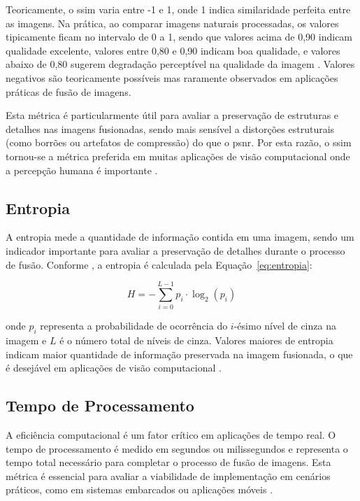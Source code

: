 Teoricamente, o \gls{ssim} varia entre -1 e 1, onde 1 indica similaridade perfeita entre as imagens. Na prática, ao comparar imagens naturais processadas, os valores tipicamente ficam no intervalo de 0 a 1, sendo que valores acima de 0,90 indicam qualidade excelente, valores entre 0,80 e 0,90 indicam boa qualidade, e valores abaixo de 0,80 sugerem degradação perceptível na qualidade da imagem \cite{wang2004image}. Valores negativos são teoricamente possíveis mas raramente observados em aplicações práticas de fusão de imagens.

Esta métrica é particularmente útil para avaliar a preservação de estruturas e detalhes nas imagens fusionadas, sendo mais sensível a distorções estruturais (como borrões ou artefatos de compressão) do que o \gls{psnr}. Por esta razão, o \gls{ssim} tornou-se a métrica preferida em muitas aplicações de visão computacional onde a percepção humana é importante \cite{wang2004image}.

\subsection*{Entropia}

A entropia mede a quantidade de informação contida em uma imagem, sendo um indicador importante para avaliar a preservação de detalhes durante o processo de fusão. Conforme , a entropia é calculada pela Equação~\ref{eq:entropia}:

\begin{equation}
\label{eq:entropia}
H = -\sum_{i=0}^{L-1} p_i \cdot \log_2(p_i)
\end{equation}

\noindent onde $p_i$ representa a probabilidade de ocorrência do $i$-ésimo nível de cinza na imagem e $L$ é o número total de níveis de cinza. Valores maiores de entropia indicam maior quantidade de informação preservada na imagem fusionada, o que é desejável em aplicações de visão computacional \cite{qu2002information}.

\subsection*{Tempo de Processamento}

A eficiência computacional é um fator crítico em aplicações de tempo real. O tempo de processamento é medido em segundos ou milissegundos e representa o tempo total necessário para completar o processo de fusão de imagens. Esta métrica é essencial para avaliar a viabilidade de implementação em cenários práticos, como em sistemas embarcados ou aplicações móveis \cite{brown2007automatic}.

